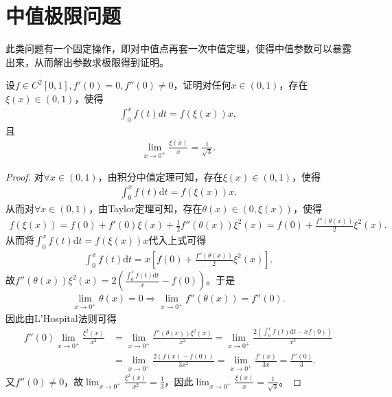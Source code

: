\documentclass[../../main.tex]{subfiles}
\begin{document}
\section{中值极限问题}

此类问题有一个固定操作，即对中值点再套一次中值定理，使得中值参数可以暴露出来，从而解出参数求极限得到证明。

\begin{example}
设$f\in C^2[0,1],f'(0)=0,f''(0)\neq 0$，证明对任何$x\in(0,1)$，存在$\xi(x)\in(0,1)$，使得
\begin{align*}
\int_0^x f(t)dt = f(\xi(x))x,
\end{align*}
且
\begin{align*}
\lim_{x\to 0^+}\frac{\xi(x)}{x}=\frac{1}{\sqrt{3}}.
\end{align*} 
\end{example}
\begin{proof}
对$\forall x\in(0,1)$，由积分中值定理可知，存在$\xi(x)\in(0,1)$，使得
\begin{align*}
\int_0^x f(t) \mathrm{d}t = f(\xi(x))x.
\end{align*}
从而对$\forall x\in(0,1)$，由Taylor定理可知，存在$\theta(x)\in(0,\xi(x))$，使得
\begin{align*}
f(\xi(x)) = f(0) + f'(0)\xi(x) + \frac{1}{2}f''(\theta(x))\xi^2(x) = f(0) + \frac{f''(\theta(x))}{2}\xi^2(x).
\end{align*}
从而将$\int_0^x f(t)\mathrm{d}t = f(\xi(x))x$代入上式可得
\begin{align*}
\int_0^x f(t)\mathrm{d}t = x\left[f(0) + \frac{f''(\theta(x))}{2}\xi^2(x)\right].
\end{align*}
故$f''(\theta(x))\xi^2(x) = 2\left(\frac{\int_0^x f(t)\mathrm{d}t}{x} - f(0)\right)$。于是
\begin{align*}
\lim_{x\to 0^+}\theta(x) = 0 \Rightarrow \lim_{x\to 0^+}f''(\theta(x)) = f''(0).
\end{align*}
因此由L'Hospital法则可得
\begin{align*}
f''(0)\lim_{x\to 0^+}\frac{\xi^2(x)}{x^2} &= \lim_{x\to 0^+}\frac{f''(\theta(x))\xi^2(x)}{x^2} = \lim_{x\to 0^+}\frac{2\left(\int_0^x f(t)\mathrm{d}t - xf(0)\right)}{x^3}\\
&= \lim_{x\to 0^+}\frac{2\left(f(x) - f(0)\right)}{3x^2} = \lim_{x\to 0^+}\frac{f'(x)}{3x} = \frac{f''(0)}{3}.
\end{align*}
又$f''(0)\neq 0$，故$\lim_{x\to 0^+}\frac{\xi^2(x)}{x^2} = \frac{1}{3}$，因此$\lim_{x\to 0^+}\frac{\xi(x)}{x} = \frac{1}{\sqrt{3}}$。 
\end{proof}
\end{document}
